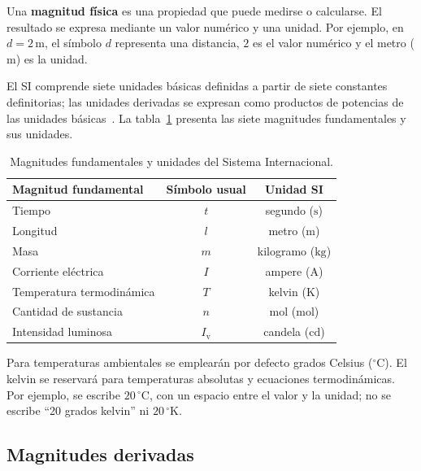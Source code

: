 Una \textbf{magnitud física} es una propiedad que puede medirse o calcularse. El resultado se expresa mediante un valor numérico y una unidad. Por ejemplo, en \(d=2\,\text{m}\), el símbolo \(d\) representa una distancia, \(2\) es el valor numérico y el metro (\(\text{m}\)) es la unidad.

El SI comprende siete unidades básicas definidas a partir de siete constantes definitorias; las unidades derivadas se expresan como productos de potencias de las unidades básicas~\cite{bipmSI2026}. La tabla~\ref{tab:u1-magnitudes-fundamentales} presenta las siete magnitudes fundamentales y sus unidades.

\begin{table}[htbp]
    \centering
    \begin{tabular}{|l|c|c|}
        \hline
        \textbf{Magnitud fundamental} & \textbf{Símbolo usual} & \textbf{Unidad SI} \\
        \hline
        Tiempo & \(t\) & segundo (\(\text{s}\)) \\
        Longitud & \(l\) & metro (\(\text{m}\)) \\
        Masa & \(m\) & kilogramo (\(\text{kg}\)) \\
        Corriente eléctrica & \(I\) & ampere (\(\text{A}\)) \\
        Temperatura termodinámica & \(T\) & kelvin (\(\text{K}\)) \\
        Cantidad de sustancia & \(n\) & mol (\(\text{mol}\)) \\
        Intensidad luminosa & \(I_\mathrm{v}\) & candela (\(\text{cd}\)) \\
        \hline
    \end{tabular}
    \caption{Magnitudes fundamentales y unidades del Sistema Internacional.}
    \label{tab:u1-magnitudes-fundamentales}
\end{table}

Para temperaturas ambientales se emplearán por defecto grados Celsius (\(^{\circ}\text{C}\)). El kelvin se reservará para temperaturas absolutas y ecuaciones termodinámicas. Por ejemplo, se escribe \(20\,^{\circ}\text{C}\), con un espacio entre el valor y la unidad; no se escribe ``20 grados kelvin'' ni \(20\,^{\circ}\text{K}\).

\subsection{Magnitudes derivadas}
\label{sec:u1-magnitudes-derivadas}

